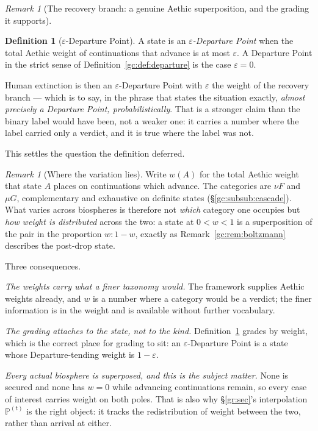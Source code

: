 \documentclass[11pt]{article}
\numberwithin{equation}{section}
\theoremstyle{plain}
\theoremstyle{definition}
\newtheorem{definition}[theorem]{Definition}
\theoremstyle{remark}
\newtheorem{remark}[theorem]{Remark}
\newcommand{\PP}{\mathbb{P}}
\begin{document}
\begin{remark}[The recovery branch: a genuine Aethic superposition,
and the grading it supports]
\begin{definition}[$\varepsilon$-Departure Point]\label{gc:def:epsdep}
A state is an \emph{$\varepsilon$-Departure Point} when the total
Aethic weight of continuations that advance is at most $\varepsilon$. A
Departure Point in the strict sense of
Definition~\ref{gc:def:departure} is the case $\varepsilon=0$.
\end{definition}

Human extinction is then an $\varepsilon$-Departure Point with
$\varepsilon$ the weight of the recovery branch --- which is to say,
in the phrase that states the situation exactly, \emph{almost precisely
a Departure Point, probabilistically}. That is a stronger claim than
the binary label would have been, not a weaker one: it carries a
number where the label carried only a verdict, and it is true where the
label was not.

This settles the question the definition deferred.

\begin{remark}[Where the variation lies]\label{gc:rem:pairsuffices}
Write $w(A)$ for the total Aethic weight that state $A$ places on
continuations which advance. The categories are $\nu F$ and $\mu G$,
complementary and exhaustive on definite states
(\S\ref{gc:subsub:cascade}). What varies across biospheres is therefore
not \emph{which} category one occupies but \emph{how weight is
distributed} across the two: a state at $0<w<1$ is a superposition of
the pair in the proportion $w:1-w$, exactly as
Remark~\ref{gc:rem:boltzmann} describes the post-drop state.

Three consequences.

\emph{The weights carry what a finer taxonomy would.} The framework
supplies Aethic weights already, and $w$ is a number where a category
would be a verdict; the finer information is in the weight and is
available without further vocabulary.

\emph{The grading attaches to the state, not to the kind.}
Definition~\ref{gc:def:epsdep} grades by weight, which is the correct
place for grading to sit: an $\varepsilon$-Departure Point is a state
whose Departure-tending weight is $1-\varepsilon$.

\emph{Every actual biosphere is superposed, and this is the subject
matter.} None is secured and none has $w=0$ while advancing
continuations remain, so every case of interest carries weight on both
poles. That is also why \S\ref{gr:sec}'s interpolation $\PP^{(t)}$ is
the right object: it tracks the redistribution of weight between the
two, rather than arrival at either.
\end{remark}


\end{remark}
\end{document}
